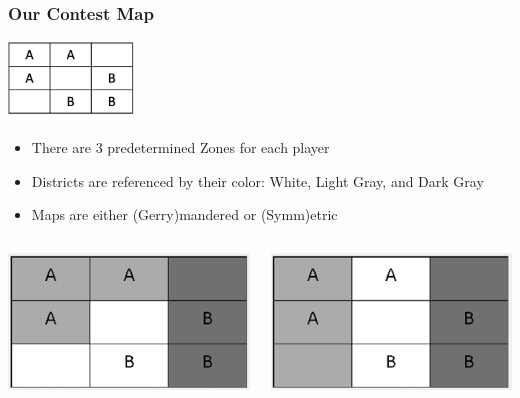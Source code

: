 \documentclass[red]{beamer}
\begin{document}
    \begin{frame} [t]
    \frametitle{Our Contest Map}
    \begin{center}
    \includegraphics[width=0.25\textwidth]{blank_map.png}
    \end{center}
    \begin{itemize}
        \item There are 3 predetermined Zones for each player
        \item Districts are referenced by their color: White, Light Gray, and Dark Gray
        \item Maps are either (Gerry)mandered or (Symm)etric
    \end{itemize}
    \vspace{0.4cm}
    \begin{columns}
    \begin{column}{0.15\textwidth}
    \includegraphics[scale = .25]{Gerry_B.png}
    \end{column}
    \begin{column}{0.15\textwidth}
    \includegraphics[scale = .25]{Symm_1_1.png}

\end{column}
\end{columns}
\end{frame}
\end{document}
